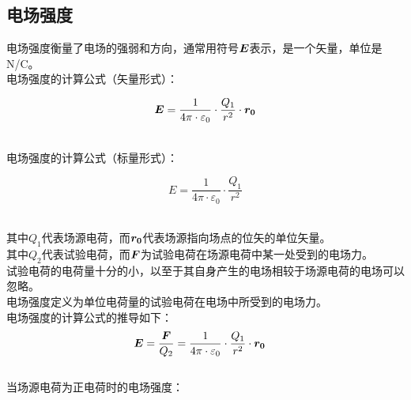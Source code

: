 \documentclass[UTF8]{ctexart}
\newcommand*{\veb}[1]{\vb*{#1}}
\begin{document}
\subsection{电场强度}
    \setcounter{equation}{0}
    电场强度衡量了电场的强弱和方向，通常用符号$\veb{E}$表示，是一个矢量，单位是\si{N/C}。\\[3mm]
    电场强度的计算公式（矢量形式）：
    \begin{large}
        \begin{equation*}
            \veb{E}=\frac{1}{4\pi\cdot\varepsilon_0}\cdot\frac{Q_1}{r^2}\cdot\veb{r_0}
        \end{equation*}
    \end{large}\\
    电场强度的计算公式（标量形式）：
    \begin{large}
        \begin{equation*}
            E=\frac{1}{4\pi\cdot\varepsilon_0}\cdot\frac{Q_1}{r^2}
        \end{equation*}
    \end{large}\\
    其中$Q_1$代表场源电荷，而$\veb{r_0}$代表场源指向场点的位矢的单位矢量。\\[3mm]
    其中$Q_2$代表试验电荷，而$\veb{F}$为试验电荷在场源电荷中某一处受到的电场力。\\[3mm]
    试验电荷的电荷量十分的小，以至于其自身产生的电场相较于场源电荷的电场可以忽略。\\[6mm]
    电场强度定义为单位电荷量的试验电荷在电场中所受到的电场力。\\[3mm]
    电场强度的计算公式的推导如下：
    \begin{align}
        &\veb{E}=\frac{\veb{F}}{Q_2}=\frac{1}{4\pi\cdot\varepsilon_0}\cdot\frac{Q_1}{r^2}\cdot\veb{r_0}
    \end{align}\\
    当场源电荷为正电荷时的电场强度：
\end{document}
